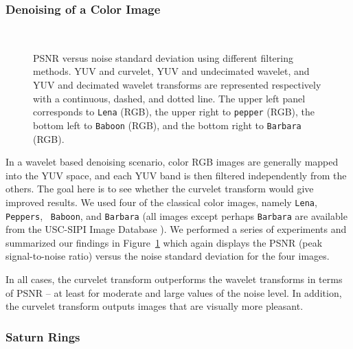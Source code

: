 \subsubsection{Denoising of a Color Image}

\begin{figure}[htb]
\centerline{
\vbox{
\hbox{
}
\hbox{
}
}}
\caption{PSNR versus noise standard deviation using different filtering
      methods. YUV and curvelet, YUV and undecimated wavelet, and YUV and
      decimated wavelet transforms are represented respectively with a
      continuous, dashed, and dotted line.  The upper left panel
      corresponds to {\tt Lena} (RGB), the upper right to {\tt pepper}
      (RGB), the bottom left to {\tt Baboon} (RGB), and the bottom right
      to {\tt Barbara} (RGB).}
\label{fig_exp_rgb_curv}
\end{figure}

In a wavelet based denoising scenario, color RGB images are generally
mapped into the YUV space, and each YUV band is then filtered
independently from the others. The goal here is to see whether the
curvelet transform would give improved results. We used four of the
classical color images, namely {\tt Lena}, {\tt Peppers}, {\tt
      Baboon}, and {\tt Barbara} (all images except perhaps {\tt Barbara}
are available from the USC-SIPI Image Database \cite{SIPI}).
We performed
a series of experiments and
summarized our findings in Figure~\ref{fig_exp_rgb_curv} which again
displays the PSNR (peak signal-to-noise ratio) 
versus the noise standard deviation for the four
images.

In all cases, the curvelet transform outperforms the wavelet
transforms in terms of PSNR -- at least for moderate and large values
of the noise level.  In addition, the curvelet transform outputs
images that are visually more pleasant.
 
\subsubsection{Saturn Rings}

